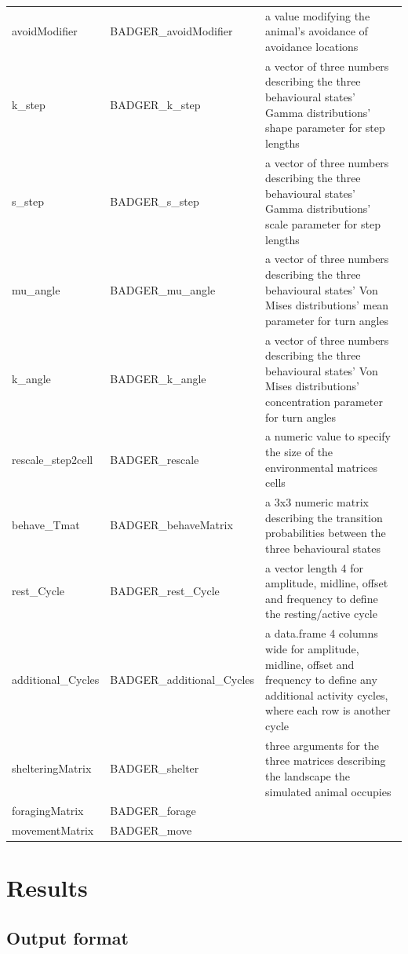 \documentclass[10pt,a4paper]{article}
\begin{document}
\begin{table}
\begin{tabular}[t]{>{\raggedright\arraybackslash}p{11em}>{\raggedright\arraybackslash}p{16em}>{\raggedright\arraybackslash}p{22em}}
avoidModifier & BADGER\_avoidModifier & a value modifying the animal's avoidance of avoidance locations\\
k\_step & BADGER\_k\_step & a vector of three numbers describing the three behavioural states' Gamma distributions' shape parameter for step lengths\\
s\_step & BADGER\_s\_step & a vector of three numbers describing the three behavioural states' Gamma distributions' scale parameter for step lengths\\
\addlinespace
mu\_angle & BADGER\_mu\_angle & a vector of three numbers describing the three behavioural states' Von Mises distributions' mean parameter for turn angles\\
k\_angle & BADGER\_k\_angle & a vector of three numbers describing the three behavioural states' Von Mises distributions' concentration parameter for turn angles\\
rescale\_step2cell & BADGER\_rescale & a numeric value to specify the size of the environmental matrices cells\\
behave\_Tmat & BADGER\_behaveMatrix & a 3x3 numeric matrix describing the transition probabilities between the three behavioural states\\
rest\_Cycle & BADGER\_rest\_Cycle & a vector length 4 for amplitude, midline, offset and frequency to define the resting/active cycle\\
\addlinespace
additional\_Cycles & BADGER\_additional\_Cycles & a data.frame 4 columns wide for amplitude, midline, offset and frequency to define any additional activity cycles, where each row is another cycle\\
shelteringMatrix & BADGER\_shelter & three arguments for the three matrices describing the landscape the simulated animal occupies\\
foragingMatrix & BADGER\_forage & \\
movementMatrix & BADGER\_move & \\
\bottomrule
\end{tabular}
\end{table}

\section{Results}\label{results}

\subsection{Output format}\label{output-format}
\end{document}

